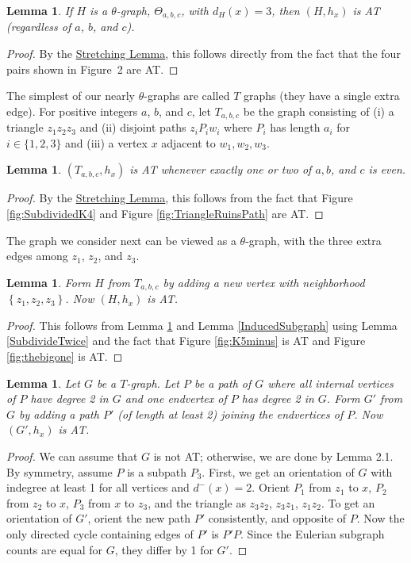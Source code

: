 \documentclass[12pt]{article}
\theoremstyle{plain}
\newtheorem{lem}[thm]{Lemma}
\theoremstyle{definition}
\theoremstyle{remark}
\newcommand{\set}[1]{\left\{ #1 \right\}}
\begin{document}
\begin{lem}\label{ThetaReducible}
If $H$ is a $\theta$-graph, $\Theta_{a,b,c}$, with $d_H(x)=3$, then $(H,h_x)$ is AT
(regardless of $a$, $b$, and $c$).
\end{lem}
\begin{proof}
By the \hyperref[SubdivideTwice]{Stretching Lemma}, this follows directly from
the fact that the four pairs
shown in Figure~2 are AT.
\end{proof}

The simplest of our nearly $\theta$-graphs are called $T$ graphs (they have a
single extra edge).  For positive integers $a$, $b$, and $c$, let $T_{a, b, c}$
be the graph consisting of
(i) a triangle $z_1z_2z_3$ and 
(ii) disjoint paths $z_iP_iw_i$ where $P_i$ has length $a_i$ for $i \in \{1,2,3\}$ and
(iii) a vertex $x$ adjacent to $w_1, w_2, w_3$.

\begin{lem}\label{TgraphReducible}
$(T_{a, b, c}, h_x)$ is AT whenever exactly one or two of $a, b$, and
$c$ is even.
\end{lem}
\begin{proof}
By the \hyperref[SubdivideTwice]{Stretching Lemma}, this follows from the fact that Figure
\ref{fig:SubdividedK4} and Figure \ref{fig:TriangleRuinsPath} are AT.
\end{proof}

The graph we consider next can be viewed as a $\theta$-graph, with the three extra
edges among $z_1$, $z_2$, and $z_3$.
\begin{lem}\label{T+graphReducible}
Form $H$ from $T_{a, b, c}$ by adding a new vertex with
neighborhood $\set{z_1, z_2, z_3}$.  Now $(H, h_x)$ is AT.
\end{lem}
\begin{proof}
This follows from Lemma \ref{TgraphReducible} and Lemma
\ref{InducedSubgraph} using Lemma \ref{SubdivideTwice} and the fact that Figure
\ref{fig:K5minus} is AT and Figure \ref{fig:thebigone} is AT.
\end{proof}


\begin{lem}\label{AddPathReducible}
Let $G$ be a $T$-graph. Let $P$ be a path of $G$ where all internal
vertices of $P$ have degree 2 in $G$ and one endvertex of $P$ has degree 2 in
$G$.  Form $G'$ from $G$ by adding a path $P'$ (of length at least 2) joining
the endvertices of $P$.  Now $(G', h_x)$ is AT.
\end{lem}
\begin{proof}
We can assume that $G$ is not AT; otherwise, we are done by Lemma 2.1.
By symmetry, assume $P$ is a subpath $P_3$. First, we get an orientation of $G$
with indegree at least 1 for all vertices and $d^-(x) = 2$. Orient $P_1$
from $z_1$ to $x$, $P_2$ from $z_2$ to $x$, $P_3$ from $x$ to $z_3$, and the triangle
as $z_3z_2$, $z_3z_1$, $z_1z_2$.  To get an orientation of $G'$, orient the
new path $P'$ consistently, and opposite of $P$.  Now the only
directed cycle containing edges of $P'$ is $P'P$.  Since the Eulerian subgraph
counts are equal for $G$, they differ by 1 for $G'$. 
\end{proof}
\end{document}
